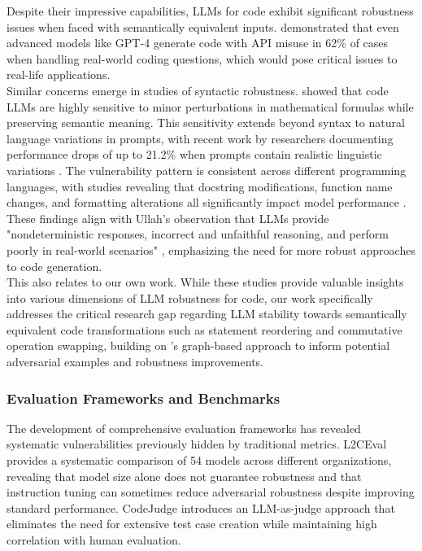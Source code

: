 \documentclass[%
thesis=student,%
coverpage=false,%
titlepage=false,%
headmarks=true, %
english,%
font=libertine, %
math=newpxtx, %
BCOR=5mm,%
coverBCOR=11mm%
]{tum-templates/book/tumbook}
\begin{document}
Despite their impressive capabilities, LLMs for code exhibit significant robustness issues when faced with semantically equivalent inputs. \textcite{Zhong2024} demonstrated that even advanced models like GPT-4 generate code with API misuse in 62\% of cases when handling real-world coding questions, which would pose critical issues to real-life applications. \\
Similar concerns emerge in studies of syntactic robustness. \textcite{Sarker2024} showed that code LLMs are highly sensitive to minor perturbations in mathematical formulas while preserving semantic meaning. 
This sensitivity extends beyond syntax to natural language variations in prompts, with recent work by researchers documenting performance drops of up to 21.2\% when prompts contain realistic linguistic variations \cite{Chen2024}. 
The vulnerability pattern is consistent across different programming languages, with studies revealing that docstring modifications, function name changes, and formatting alterations all significantly impact model performance \cite{Rabbi2024}. 
These findings align with Ullah's observation that LLMs provide "nondeterministic responses, incorrect and unfaithful reasoning, and perform poorly in real-world scenarios" \cite{Ullah2023}, emphasizing the need for more robust approaches to code generation. \\
This also relates to our own work. While these studies provide valuable insights into various dimensions of LLM robustness for code, our work specifically addresses the critical research gap regarding LLM stability towards semantically equivalent code transformations such as statement reordering and commutative operation swapping, building on \textcite{Geisler2023}'s graph-based approach to inform potential adversarial examples and robustness improvements.

\subsubsection{Evaluation Frameworks and Benchmarks}

The development of comprehensive evaluation frameworks has revealed systematic vulnerabilities previously hidden by traditional metrics. L2CEval \cite{Ni2023} provides a systematic comparison of 54 models across different organizations, revealing that model size alone does not guarantee robustness and that instruction tuning can sometimes reduce adversarial robustness despite improving standard performance. CodeJudge \cite{Tong2024} introduces an LLM-as-judge approach that eliminates the need for extensive test case creation while maintaining high correlation with human evaluation.
\end{document}
